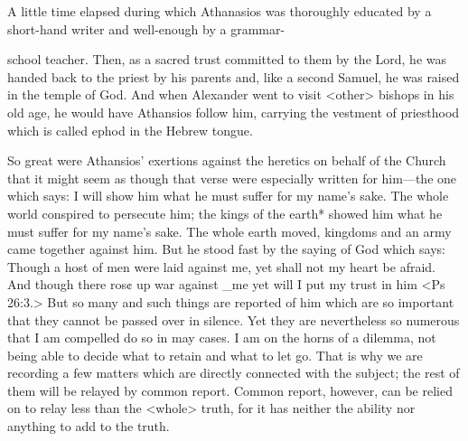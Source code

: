 A little time elapsed during which Athanasios was thoroughly
educated by a short-hand writer and well-enough by a grammar-

school teacher.
Then, as a sacred trust committed to them by the
Lord, he was handed back to the priest by his parents and, like a
second Samuel, he was raised in the temple of God.
And when
Alexander went to visit <other> bishops in his old age, he would
have Athansios follow him, carrying the vestment of priesthood
which is called ephod in the Hebrew tongue.

So great were Athansios' exertions against the heretics on behalf
of the Church that it might seem as though that verse were
especially written for him—the one which says: I will show him
what he must suffer for my name's sake.
The whole world conspired
to persecute him; the kings of the earth* showed him what he must
suffer for my name's sake.
The whole earth moved, kingdoms and
an army came together against him.
But he stood fast by the saying
of God which says: Though a host of men were laid against me, yet
shall not my heart be afraid.
And though there ros¢ up war against
\_me yet will I put my trust in him <Ps 26:3.> But so many and such
things are reported of him which are so important that they cannot
be passed over in silence.
Yet they are nevertheless so numerous that
I am compelled do so in may cases.
I am on the horns of a
dilemma, not being able to decide what to retain and what to let go.
That is why we are recording a few matters which are directly
connected with the subject; the rest of them will be relayed by
common report.
Common report, however, can be relied on to relay
less than the <whole> truth, for it has neither the ability nor
anything to add to the truth.

